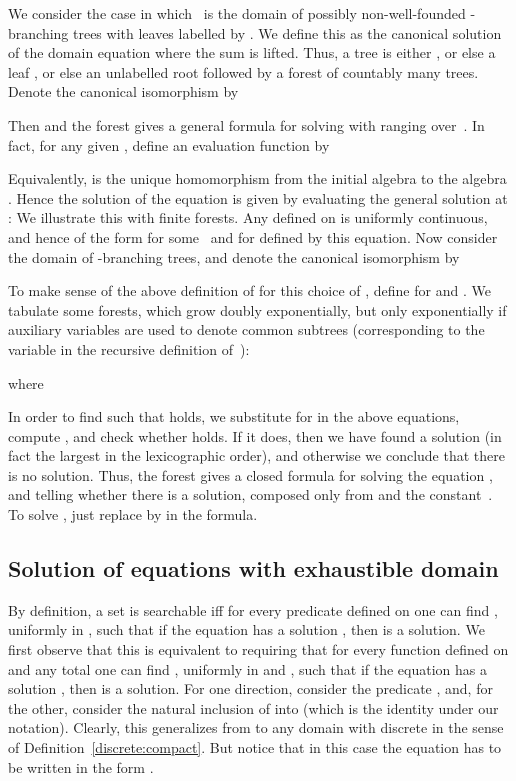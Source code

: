 \documentclass{LMCS}
\begin{document}
We consider the case in which~ is the domain of possibly
non-well-founded -branching trees with leaves labelled by .
We define this as the canonical solution of the domain equation
 where the sum is lifted.  Thus, a
tree is either , or else a leaf , or else an unlabelled root
followed by a forest of countably many trees.  Denote the
canonical isomorphism by

Then  and the forest 
gives a general formula for solving  with 
ranging over~.  In fact, for any given , define an evaluation function  by

Equivalently,  is the unique homomorphism
from the initial algebra  to the
algebra .  Hence the
solution  of the equation  is given by evaluating
the general solution  at :
 We illustrate this with finite
forests.  Any  defined on 
is uniformly continuous, and hence of the form
 for some~ and for  defined by this equation.  Now consider
the domain  of -branching trees,
 and denote the canonical isomorphism by

To make sense of the above definition of  for this choice of ,
define  for  and . We tabulate some forests, which grow doubly exponentially, but
only exponentially if auxiliary variables are used to denote common
subtrees (corresponding to the variable  in the recursive
definition of~):

where

In order to find  such that  holds, we substitute  for  in the above equations,
compute , and check whether 
holds. If it does, then we have found a solution (in fact the largest
in the lexicographic order), and otherwise we conclude that there is
no solution.  Thus, the forest  gives a closed formula for
solving the equation , and telling whether there is a
solution, composed only from  and the constant~.  To solve
, just replace  by  in the formula.

\subsection{Solution of equations with exhaustible domain}

By definition, a set  is searchable iff for every
predicate  defined on  one can find , uniformly in , such that if the equation  has a
solution , then  is a solution.  We first observe that
this is equivalent to requiring that for every function  defined on  and any total  one can find , uniformly in  and , such that if the equation  has a
solution , then  is a solution. For one direction,
consider the predicate , and, for the other,
consider the natural inclusion of  into  (which is the
identity under our notation). Clearly, this generalizes from  to
any domain  with  discrete in the sense of
Definition~\ref{discrete:compact}. But notice that in this case the
equation has to be written in the form .
\end{document}
